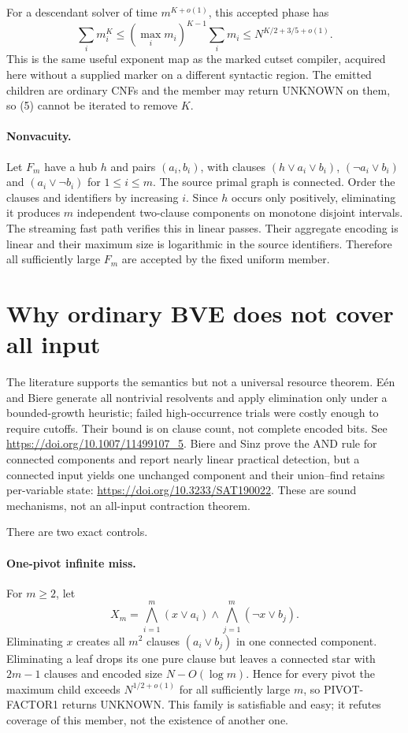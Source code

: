\documentclass[11pt]{article}
\begin{document}
For a descendant solver of time $m^{K+o(1)}$, this accepted phase has
\[
 \sum_i m_i^K\le (\max_i m_i)^{K-1}\sum_i m_i
 \le N^{K/2+3/5+o(1)}.                                   \tag{5}
\]
This is the same useful exponent map as the marked cutset compiler, acquired
here without a supplied marker on a different syntactic region.  The emitted
children are ordinary CNFs and the member may return UNKNOWN on them, so (5)
cannot be iterated to remove $K$.

\paragraph{Nonvacuity.}
Let $F_m$ have a hub $h$ and pairs $(a_i,b_i)$, with clauses
$(h\vee a_i\vee b_i)$, $(\neg a_i\vee b_i)$ and
$(a_i\vee\neg b_i)$ for $1\le i\le m$.  The source primal graph is
connected.  Order the clauses and identifiers by increasing $i$.  Since $h$
occurs only positively, eliminating it produces $m$ independent two-clause
components on monotone disjoint intervals.  The streaming fast path verifies
this in linear passes.  Their aggregate encoding is linear and their maximum
size is logarithmic in the source identifiers.  Therefore all sufficiently
large $F_m$ are accepted by the fixed uniform member.

\section{Why ordinary BVE does not cover all input}

The literature supports the semantics but not a universal resource theorem.
E\'en and Biere generate all nontrivial resolvents and apply elimination only
under a bounded-growth heuristic; failed high-occurrence trials were costly
enough to require cutoffs.  Their bound is on clause count, not complete
encoded bits.  See
\url{https://doi.org/10.1007/11499107_5}.  Biere and Sinz prove the AND rule
for connected components and report nearly linear practical detection, but a
connected input yields one unchanged component and their union--find retains
per-variable state:
\url{https://doi.org/10.3233/SAT190022}.  These are sound mechanisms, not an
all-input contraction theorem.

There are two exact controls.

\paragraph{One-pivot infinite miss.}
For $m\ge2$, let
\[
 X_m=\bigwedge_{i=1}^m(x\vee a_i)\wedge
     \bigwedge_{j=1}^m(\neg x\vee b_j).                   \tag{6}
\]
Eliminating $x$ creates all $m^2$ clauses $(a_i\vee b_j)$ in one connected
component.  Eliminating a leaf drops its one pure clause but leaves a
connected star with $2m-1$ clauses and encoded size $N-O(\log m)$.  Hence for
every pivot the maximum child exceeds $N^{1/2+o(1)}$ for all sufficiently
large $m$, so PIVOT-FACTOR1 returns UNKNOWN.  This family is satisfiable and
easy; it refutes coverage of this member, not the existence of another one.
\end{document}
